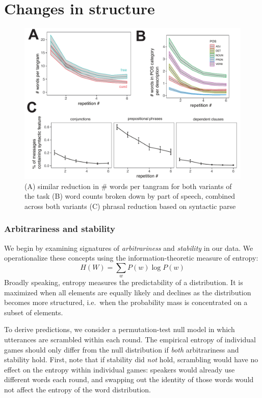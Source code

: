 \documentclass[alpha-refs]{wiley-article}
\begin{document}
\section{Changes in structure}\label{results}

\begin{figure}[t]
\includegraphics[scale=.65]{reduction.pdf}
\caption{(A) similar reduction in \# words per tangram for both variants of the task (B) word counts broken down by part of speech, combined across both variants (C) phrasal reduction based on syntactic parse }
\label{fig:reduction}
\end{figure}

\subsubsection{Arbitrariness and
stability}\label{arbitrariness-and-stability}

We begin by examining signatures of \emph{arbitrariness} and
\emph{stability} in our data. We operationalize these concepts using the
information-theoretic measure of entropy:
\[H(W) = \sum_w P(w) \log P(w)\] Broadly speaking, entropy measures the
predictability of a distribution. It is maximized when all elements are
equally likely and declines as the distribution becomes more structured,
i.e.~when the probability mass is concentrated on a subset of elements.

To derive predictions, we consider a permutation-test null model in
which utterances are scrambled within each round. The empirical entropy
of individual games should only differ from the null distribution if
\emph{both} arbitrariness and stability hold. First, note that if
stability did \emph{not} hold, scrambling would have no effect on the
entropy within individual games: speakers would already use different
words each round, and swapping out the identity of those words would not
affect the entropy of the word distribution.
\end{document}

